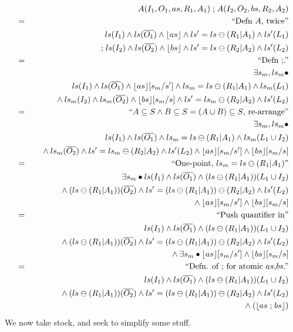 \begin{eqnarray*}
  && A(I_1,O_1,as,R_1,A_1) \mathrel{;} A(I_2,O_2,bs,R_2,A_2)
\\&=&\textrm{``Defn $A$, twice''}
\\&& ls(I_1) \land ls(\overline{O_1}) \land \lfloor as\rfloor 
     \land ls'=ls\ominus(R_1|A_1) \land ls'(L_1)
\\&& {} \mathrel{;}
     ls(I_2) \land ls(\overline{O_2}) \land \lfloor bs\rfloor 
     \land ls'=ls\ominus(R_2|A_2) \land ls'(L_2)
\\&=&\textrm{``Defn $\mathrel{;}$.''}
\\&& \exists s_m,ls_m \bullet
\\&& \qquad ls(I_1) \land ls(\overline{O_1}) \land \lfloor as\rfloor[s_m/s']
     \land ls_m = ls\ominus(R_1|A_1) \land ls_m(L_1)
\\&& \quad {} \land
     ls_m(I_2) \land ls_m(\overline{O_2}) \land \lfloor bs\rfloor[s_m/s]
     \land ls' = ls_m\ominus(R_2|A_2) \land ls'(L_2)
\\&=&\textrm{``$A \subseteq S \land B \subseteq S = (A \cup B) \subseteq S$, re-arrange''}
\\&& \exists s_m,ls_m \bullet
\\&& \qquad ls(I_1) \land ls(\overline{O_1}) \land ls_m = ls\ominus(R_1|A_1)
     \land ls_m(L_1 \cup I_2)
\\&& \quad {}\land ls_m(\overline{O_2}) \land ls' = ls_m\ominus(R_2|A_2) \land ls'(L_2)
     \land \lfloor as\rfloor[s_m/s'] \land \lfloor bs\rfloor[s_m/s]
\\&=&\textrm{``One-point, $ls_m = ls\ominus(R_1|A_1)$''}
\\&& \exists s_m \bullet ls(I_1) \land ls(\overline{O_1})
     \land (ls\ominus(R_1|A_1))(L_1 \cup I_2)
\\&& \qquad {}\land (ls\ominus(R_1|A_1))(\overline{O_2})
      \land ls' = (ls\ominus(R_1|A_1))\ominus(R_2|A_2) \land ls'(L_2)
\\&& \qquad {} \land \lfloor as\rfloor[s_m/s'] \land \lfloor bs\rfloor[s_m/s]
\\&=&\textrm{``Push quantifier in''}
\\&& ls(I_1)  \land ls(\overline{O_1})
     \land (ls\ominus(R_1|A_1))(L_1 \cup I_2)
\\&& {}\land (ls\ominus(R_1|A_1))(\overline{O_2})
      \land ls' = (ls\ominus(R_1|A_1))\ominus(R_2|A_2) \land ls'(L_2)
\\&& {}\land \exists s_m \bullet \lfloor as\rfloor[s_m/s'] \land \lfloor bs\rfloor[s_m/s]
\\&=&\textrm{``Defn. of $\mathrel{;}$ for atomic $as$,$bs$.''}
\\&& ls(I_1)  \land ls(\overline{O_1})
     \land (ls\ominus(R_1|A_1))(L_1 \cup I_2)
\\&& {}\land (ls\ominus(R_1|A_1))(\overline{O_2})
      \land ls' = (ls\ominus(R_1|A_1))\ominus(R_2|A_2) \land ls'(L_2)
\\&& {}\land (\lfloor as \mathrel{;} bs\rfloor)
\end{eqnarray*}
We now take stock, and seek to simplify some stuff.

